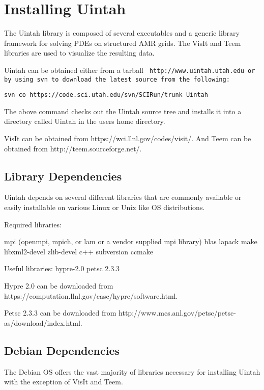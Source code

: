 \section{Installing Uintah} \label{Sec:installation}

The Uintah library is composed of several executables and a generic
library framework for solving PDEs on structured AMR grids.  The VisIt
and Teem libraries are used to visualize the resulting data.

Uintah can be obtained either from a tarball \tt
http://www.uintah.utah.edu \normalfont or by using svn to download the
latest source from the following:

\begin{Verbatim}[fontsize=\footnotesize]
  svn co https://code.sci.utah.edu/svn/SCIRun/trunk Uintah
\end{Verbatim}

The above command checks out the Uintah source tree and installs it
into a directory called Uintah in the users home directory.

VisIt can be obtained from https://wci.llnl.gov/codes/visit/. And Teem
can be obtained from http://teem.sourceforge.net/.


\subsection{Library Dependencies}

Uintah depends on several different libraries that are commonly
available or easily installable on various Linux or Unix like OS
distributions.  

Required libraries:

mpi (openmpi, mpich, or lam or a vendor supplied mpi library)
blas
lapack
make
libxml2-devel
zlib-devel
c++
subversion
ccmake

Useful libraries:
hypre-2.0
petsc 2.3.3

Hypre 2.0 can be downloaded from
https://computation.llnl.gov/casc/hypre/software.html.

Petsc 2.3.3 can be downloaded from
http://www.mcs.anl.gov/petsc/petsc-as/download/index.html.


\subsection{Debian Dependencies}

The Debian OS offers the vast majority of libraries necessary for
installing Uintah with the exception of VisIt and Teem.

